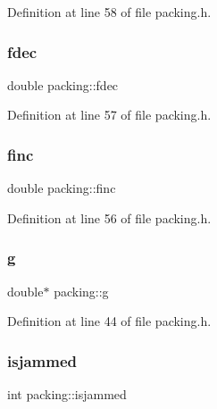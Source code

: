 Definition at line 58 of file packing.\+h.

\mbox{\label{classpacking_a2188035c9e34ec7f636822e83e785513}} 
\subsubsection{\texorpdfstring{fdec}{fdec}}
{\footnotesize\ttfamily double packing\+::fdec\hspace{0.3cm}{\ttfamily [protected]}}



Definition at line 57 of file packing.\+h.

\mbox{\label{classpacking_ac67189efe0f5c00878074d9e1a6fd80a}} 
\subsubsection{\texorpdfstring{finc}{finc}}
{\footnotesize\ttfamily double packing\+::finc\hspace{0.3cm}{\ttfamily [protected]}}



Definition at line 56 of file packing.\+h.

\mbox{\label{classpacking_abe2f507633454e3d2d8fd42161bcae09}} 
\subsubsection{\texorpdfstring{g}{g}}
{\footnotesize\ttfamily double$\ast$ packing\+::g\hspace{0.3cm}{\ttfamily [protected]}}



Definition at line 44 of file packing.\+h.

\mbox{\label{classpacking_a8a79180aa5d7bd8faa6d048f036f5d2b}} 
\subsubsection{\texorpdfstring{isjammed}{isjammed}}
{\footnotesize\ttfamily int packing\+::isjammed\hspace{0.3cm}{\ttfamily [protected]}}



